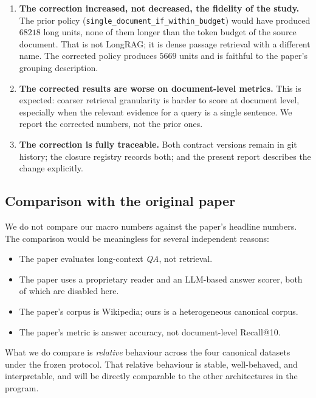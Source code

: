 \documentclass[11pt,a4paper]{article}
\begin{document}
\begin{enumerate}[leftmargin=1.5em,itemsep=0.15em]
  \item \textbf{The correction increased, not decreased, the
    fidelity of the study.} The prior policy
    (\texttt{single\_document\_if\_within\_budget}) would have
    produced $68218$ long units, none of them longer than the
    token budget of the source document. That is not LongRAG; it is
    dense passage retrieval with a different name. The corrected
    policy produces $5669$ units and is faithful to the paper's
    grouping description.
  \item \textbf{The corrected results are worse on document-level
    metrics.} This is expected: coarser retrieval granularity is
    harder to score at document level, especially when the
    relevant evidence for a query is a single sentence. We report
    the corrected numbers, not the prior ones.
  \item \textbf{The correction is fully traceable.} Both
    contract versions remain in git history; the closure registry
    records both; and the present report describes the change
    explicitly.
\end{enumerate}

\subsection{Comparison with the original paper}
We do not compare our macro numbers against the paper's headline
numbers. The comparison would be meaningless for several independent
reasons:

\begin{itemize}[leftmargin=1.5em,itemsep=0.15em]
  \item The paper evaluates long-context \emph{QA}, not retrieval.
  \item The paper uses a proprietary reader and an LLM-based
    answer scorer, both of which are disabled here.
  \item The paper's corpus is Wikipedia; ours is a heterogeneous
    canonical corpus.
  \item The paper's metric is answer accuracy, not document-level
    Recall@10.
\end{itemize}

What we do compare is \emph{relative} behaviour across the four
canonical datasets under the frozen protocol. That relative
behaviour is stable, well-behaved, and interpretable, and will be
directly comparable to the other architectures in the program.
\end{document}
